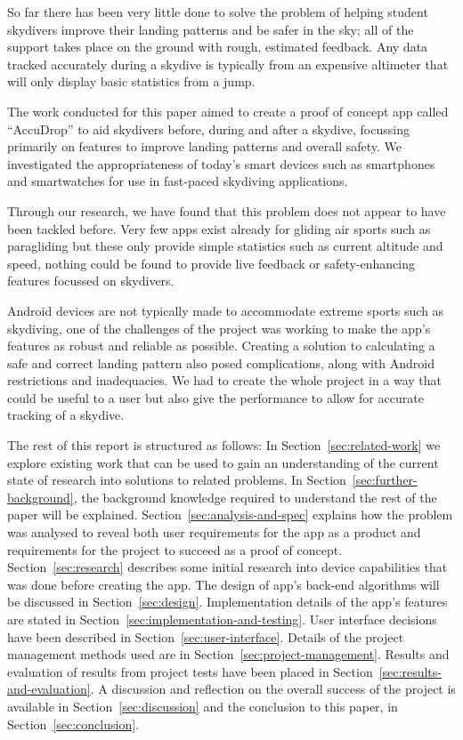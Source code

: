 So far there has been very little done to solve the problem of helping student skydivers improve their landing patterns and be safer in the sky; all of the support takes place on the ground with rough, estimated feedback. Any data tracked accurately during a skydive is typically from an expensive altimeter that will only display basic statistics from a jump.

The work conducted for this paper aimed to create a proof of concept app called ``AccuDrop'' to aid skydivers before, during and after a skydive, focussing primarily on features to improve landing patterns and overall safety. We investigated the appropriateness of today's smart devices such as smartphones and smartwatches for use in fast-paced skydiving applications.

Through our research, we have found that this problem does not appear to have been tackled before. Very few apps exist already for gliding air sports such as paragliding but these only provide simple statistics such as current altitude and speed, nothing could be found to provide live feedback or safety-enhancing features focussed on skydivers.

Android devices are not typically made to accommodate extreme sports such as skydiving, one of the challenges of the project was working to make the app's features as robust and reliable as possible. Creating a solution to calculating a safe and correct landing pattern also posed complications, along with Android restrictions and inadequacies. We had to create the whole project in a way that could be useful to a user but also give the performance to allow for accurate tracking of a skydive.

The rest of this report is structured as follows: In Section~\ref{sec:related-work} we explore existing work that can be used to gain an understanding of the current state of research into solutions to related problems. In Section~\ref{sec:further-background}, the background knowledge required to understand the rest of the paper will be explained. Section~\ref{sec:analysis-and-spec} explains how the problem was analysed to reveal both user requirements for the app as a product and requirements for the project to succeed as a proof of concept. Section~\ref{sec:research} describes some initial research into device capabilities that was done before creating the app. The design of app's back-end algorithms will be discussed in Section~\ref{sec:design}. Implementation details of the app's features are stated in Section~\ref{sec:implementation-and-testing}. User interface decisions have been described in Section~\ref{sec:user-interface}. Details of the project management methods used are in Section~\ref{sec:project-management}. Results and evaluation of results from project tests have been placed in Section~\ref{sec:results-and-evaluation}. A discussion and reflection on the overall success of the project is available in Section~\ref{sec:discussion} and the conclusion to this paper, in Section~\ref{sec:conclusion}.
